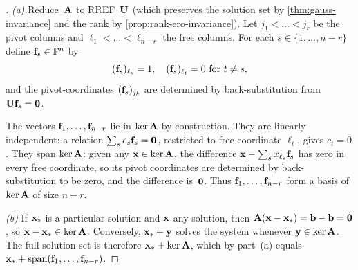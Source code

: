 \begin{proof}[]
\emph{(a)} Reduce~$\mathbf{A}$ to RREF~$\mathbf{U}$ (which preserves the
solution set by \cref{thm:gauss-invariance} and the rank by
\cref{prop:rank-ero-invariance}). Let $j_1 < \dots < j_r$ be the pivot
columns and $\ell_1 < \dots < \ell_{n-r}$ the free columns. For each
$s \in \{1, \dots, n-r\}$ define $\mathbf{f}_s \in \mathbb{F}^n$ by
\[
  (\mathbf{f}_s)_{\ell_s} = 1, \quad
  (\mathbf{f}_s)_{\ell_t} = 0 \text{ for } t \neq s,
\]
and the pivot-coordinates $(\mathbf{f}_s)_{j_k}$ are determined by
back-substitution from $\mathbf{U}\mathbf{f}_s = \mathbf{0}$.

The vectors $\mathbf{f}_1, \dots, \mathbf{f}_{n-r}$ lie in $\ker \mathbf{A}$
by construction. They are linearly independent: a relation
$\sum_s c_s \mathbf{f}_s = \mathbf{0}$, restricted to free coordinate
$\ell_t$, gives $c_t = 0$. They span $\ker \mathbf{A}$: given any
$\mathbf{x} \in \ker \mathbf{A}$, the difference
$\mathbf{x} - \sum_s x_{\ell_s}\mathbf{f}_s$ has zero in every free
coordinate, so its pivot coordinates are determined by
back-substitution to be zero, and the difference is~$\mathbf{0}$.
Thus $\mathbf{f}_1, \dots, \mathbf{f}_{n-r}$ form a basis of $\ker \mathbf{A}$
of size $n - r$.

\emph{(b)} If $\mathbf{x}_*$ is a particular solution and $\mathbf{x}$ any
solution, then $\mathbf{A}(\mathbf{x} - \mathbf{x}_*) = \mathbf{b} - \mathbf{b} = \mathbf{0}$,
so $\mathbf{x} - \mathbf{x}_* \in \ker \mathbf{A}$. Conversely, $\mathbf{x}_* + \mathbf{y}$
solves the system whenever $\mathbf{y} \in \ker \mathbf{A}$. The full solution
set is therefore $\mathbf{x}_* + \ker \mathbf{A}$, which by part~(a) equals
$\mathbf{x}_* + \operatorname{span}(\mathbf{f}_1, \dots, \mathbf{f}_{n-r})$.
\end{proof}

